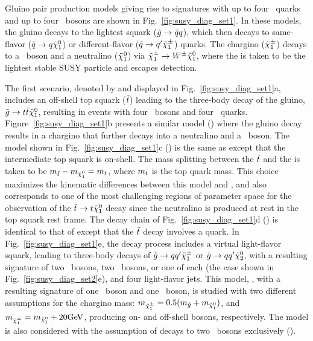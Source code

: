 Gluino pair production models giving rise to signatures with up to four \cPqb\
quarks and up to four \PW\ bosons are shown in Fig.~\ref{fig:susy_diag_set1}. In
these models, the gluino decays to the lightest squark ($\tilde{g} \to \tilde{q}
q$), which then decays to same-flavor ($\tilde{q} \to q \tilde{\chi}_1^0$) or
different-flavor ($\tilde{q} \to q' \tilde{\chi}_1^{\pm}$) quarks. The chargino
($\tilde{\chi}_1^{\pm}$) decays to a \PW\ boson and a neutralino ($\tilde{\chi}_1^0$) via $\tilde{\chi}_1^{\pm}
\to W^{\pm} \tilde{\chi}_1^0$, where the \lsp is taken to be the lightest stable SUSY
particle and escapes detection.

The first scenario, denoted by \Totttt and displayed in
Fig.~\ref{fig:susy_diag_set1}a, includes an off-shell top squark ($\tilde{t}$)
leading to the three-body decay of the gluino, $\tilde{g} \to t\bar{t}\tilde{\chi}_1^0$,
resulting in events with four \PW\ bosons and four \cPqb\ quarks.
Figure~\ref{fig:susy_diag_set1}b presents a similar model (\TfttbbWW) where the
gluino decay results in a chargino that further decays into a neutralino and
a \PW\ boson. The model shown in Fig.~\ref{fig:susy_diag_set1}c (\Tftttt) is the
same as \Totttt except that the intermediate top squark is on-shell. The mass
splitting between the $\tilde{t}$ and the \lsp is taken to be $m_{\tilde{t}} -
m_{\tilde{\chi}_1^0} = m_{t}$, where $m_{t}$ is the top quark mass. This choice
maximizes the kinematic differences between this model and \Totttt, and also
corresponds to one of the most challenging regions of parameter space for the
observation of the $\tilde{t} \to t \tilde{\chi}_1^0$ decay since the neutralino is
produced at rest in the top squark rest frame. The decay chain of
Fig.~\ref{fig:susy_diag_set1}d (\Tfttcc) is identical to that of \Tftttt except
that the $\tilde{t}$ decay involves a \PQc quark. In
Fig.~\ref{fig:susy_diag_set1}e, the decay process includes a virtual light-flavor
squark, leading to three-body decays of $\tilde{g} \to q q' \tilde{\chi}_1^{\pm}$ or
$\tilde{g} \to q q' \tilde{\chi}_2^0$, with a resulting signature of two
\PW\ bosons, two \PZ\ bosons, or one of each (the case shown in
Fig.~\ref{fig:susy_diag_set2}e), and four light-flavor jets. This model,
\TfqqqqWZ, with a resulting signature of one \PW\ boson and one \PZ\ boson,
is studied with two different assumptions for the chargino mass:
$m_{\tilde{\chi}_1^{\pm}} = 0.5(m_{\tilde{g}} + m_{\tilde{\chi}_1^0})$, and $m_{\tilde{\chi}_1^{\pm}} =
m_{\tilde{\chi}_1^0}+20 \text{GeV}$, producing on- and off-shell bosons, respectively. The
model is also considered with the assumption of decays to two \PW\ bosons
exclusively (\TfqqqqWW).

